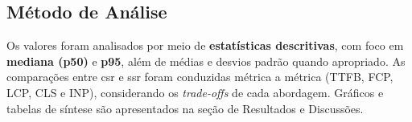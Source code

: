 \subsection{Método de Análise}

Os valores foram analisados por meio de \textbf{estatísticas descritivas}, com foco em \textbf{mediana (p50)} e \textbf{p95}, além de médias e desvios padrão quando apropriado. As comparações entre \acrshort{csr} e \acrshort{ssr} foram conduzidas métrica a métrica (TTFB, FCP, LCP, CLS e INP), considerando os \textit{trade-offs} de cada abordagem. Gráficos e tabelas de síntese são apresentados na seção de Resultados e Discussões.
